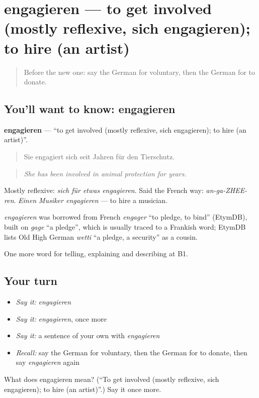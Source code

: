 \section[engagieren]{engagieren — to get involved (mostly reflexive, sich engagieren); to hire (an artist)}

\label{lesson:GE-C362-engagieren}



\begin{quote}
Before the new one: say the German for voluntary, then the German for to donate.
\end{quote}

\subsection*{You'll want to know: engagieren}
\textbf{engagieren} — \textquotedblleft{}to get involved (mostly reflexive, sich engagieren); to hire (an artist)\textquotedblright{}.

\begin{quote}
Sie engagiert sich seit Jahren für den Tierschutz.
\end{quote}

\begin{quote}
\emph{She has been involved in animal protection for years.}
\end{quote}

Mostly reflexive: \emph{sich für etwas engagieren}. Said the French way: \emph{an-ga-ZHEE-ren}. \emph{Einen Musiker engagieren} — to hire a musician.

\begin{cousinweb}
\emph{engagieren} was borrowed from French \emph{engager} \textquotedblleft{}to pledge, to bind\textquotedblright{} (EtymDB), built on \emph{gage} \textquotedblleft{}a pledge\textquotedblright{}, which is usually traced to a Frankish word; EtymDB lists Old High German \emph{wetti} \textquotedblleft{}a pledge, a security\textquotedblright{} as a cousin.
\end{cousinweb}

\begin{grammarlens}[title={What you've built}]
One more word for telling, explaining and describing at B1.
\end{grammarlens}

\subsection*{Your turn}
\begin{itemize}
\raggedright
  \item \emph{Say it:} \emph{engagieren}
  \item \emph{Say it:} \emph{engagieren}, once more
  \item \emph{Say it:} a sentence of your own with \emph{engagieren}
  \item \emph{Recall:} say the German for voluntary, then the German for to donate, then say \emph{engagieren} again
\end{itemize}

\begin{tcolorbox}[breakable,colback=teal!4,colframe=teal!35!black,title={Before you move on}]
What does engagieren mean? (\textquotedblleft{}To get involved (mostly reflexive, sich engagieren); to hire (an artist)\textquotedblright{}.) Say it once more.
\end{tcolorbox}
